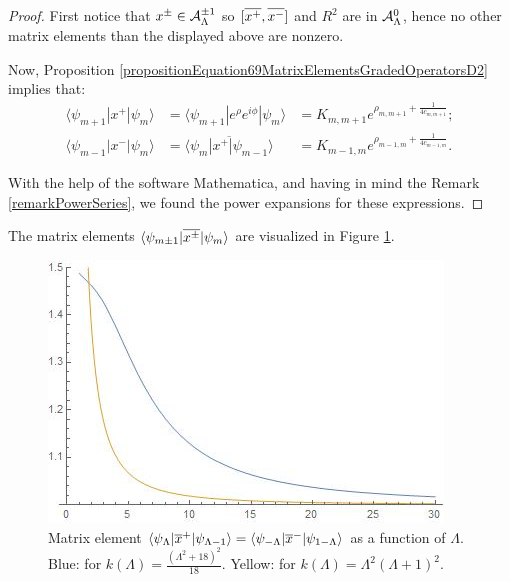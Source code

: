 \begin{proof}
First notice that $x^\pm \in \mathcal A^{\pm 1}_\Lambda$ so $[\overline{x^+}, \overline{x^-}]$ and $R^2$ are in $\mathcal A^0_\Lambda$, hence no other matrix elements than the displayed above are nonzero. 

Now, Proposition \ref{propositionEquation69MatrixElementsGradedOperatorsD2} implies that:
\begin{align*}
    \langle \psi_{m+1} | x^+ | \psi_m \rangle 
        &= %
        \langle \psi_{m+1} | e^\rho e^{i\phi} | \psi_m \rangle
        &= %
        K_{m,m+1} e^{\rho_{m,m+1} + \frac{1}{4 c_{m,m+1}}};\\
    \langle \psi_{m-1} | x^- | \psi_m \rangle 
        &= \overline{\langle \psi_{m} | x^+ | \psi_{m-1} \rangle}
        &= K_{m-1,m} e^{\rho_{m-1,m} + \frac{1}{4 c_{m-1,m}}}.
\end{align*}

With the help of the software Mathematica, and having in mind the Remark \ref{remarkPowerSeries}, we found the power expansions for these expressions.
\end{proof}

The matrix elements $\langle \psi_{m\pm 1} | \overline{x^\pm}|\psi_m \rangle$ are visualized in Figure \ref{fig:originalbn}.

\begin{figure}[h]
    \centering
    \includegraphics[width = 2\textwidth/3]{images/xCoefsTwoks.jpg}
    \caption{Matrix element $\langle \psi_{\Lambda} |\overline{x}^+ | \psi_{\Lambda-1}\rangle = \langle \psi_{-\Lambda} |\overline{x}^- | \psi_{1-\Lambda}\rangle$ as a function of $\Lambda$. Blue: for $k(\Lambda) = \frac{(\Lambda^2 + 18)^2}{18}$. Yellow: for $k(\Lambda) = \Lambda^2(\Lambda+1)^2$.}
    \label{fig:originalbn}
\end{figure}

